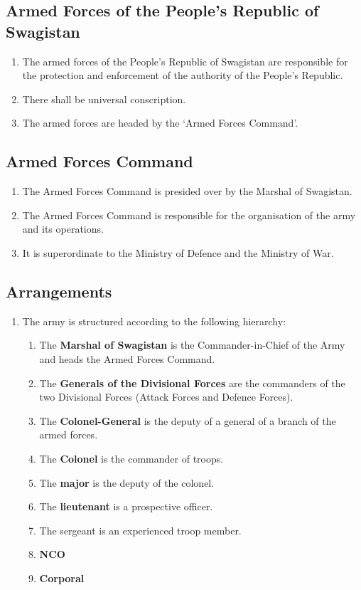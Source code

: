 \documentclass{article}
\begin{document}
\subsection{Armed Forces of the People's Republic of Swagistan}
\begin{enumerate}[(1)]
    \item The armed forces of the People's Republic of Swagistan are responsible for the protection and enforcement of the authority of the People's Republic.
    \item There shall be universal conscription.
    \item The armed forces are headed by the `Armed Forces Command'.
\end{enumerate}

\subsection{Armed Forces Command}
\begin{enumerate}[(1)]
    \item The Armed Forces Command is presided over by the Marshal of Swagistan.
    \item The Armed Forces Command is responsible for the organisation of the army and its operations.
    \item It is superordinate to the Ministry of Defence and the Ministry of War.
\end{enumerate}

\subsection{Arrangements}
\begin{enumerate}[(1)]
    \item The army is structured according to the following hierarchy:
    \begin{enumerate}[(1)]
        \item The \textbf{Marshal of Swagistan} is the Commander-in-Chief of the Army and heads the Armed Forces Command.
        \item The \textbf{Generals of the Divisional Forces} are the commanders of the two Divisional Forces (Attack Forces and Defence Forces).
        \item The \textbf{Colonel-General} is the deputy of a general of a branch of the armed forces.
        \item The \textbf{Colonel} is the commander of troops.
        \item The \textbf{major} is the deputy of the colonel.
        \item The \textbf{lieutenant} is a prospective officer.
        \item The sergeant is an experienced troop member.
        \item \textbf{NCO}
        \item \textbf{Corporal}
    \end{enumerate}
\end{enumerate}
\end{document}
